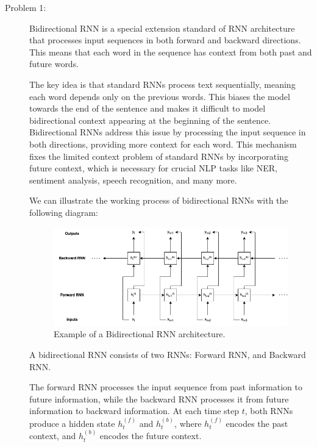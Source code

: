 \documentclass[10pt]{article}
\begin{document}
\begin{description}
\item[Problem 1:] \hfill %

Bidirectional RNN is a special extension standard of RNN architecture that processes input sequences in both forward and backward directions.
This means that each word in the sequence has context from both past and future words.

The key idea is that standard RNNs process text sequentially, meaning each word depends only on the previous words.
This biases the model towards the end of the sentence and makes it difficult to model bidirectional context appearing at the beginning of the sentence.
Bidirectional RNNs address this issue by processing the input sequence in both directions, providing more context for each word.
This mechanism fixes the limited context problem of standard RNNs by incorporating future context, which is necessary for crucial NLP tasks like NER, 
sentiment analysis, speech recognition, and many more.

We can illustrate the working process of bidirectional RNNs with the following diagram:

\begin{figure}[h]
    \centering
    \includegraphics[width=1\textwidth]{biRNN.png}
    \caption{Example of a Bidirectional RNN architecture.}
\end{figure}

A bidirectional RNN consists of two RNNs: Forward RNN, and Backward RNN. 

The forward RNN processes the input sequence from past information to future information, while the backward RNN processes it from 
future information to backward information.
At each time step $t$, both RNNs produce a hidden state $h_t^{(f)}$ and $h_t^{(b)}$, 
where $h_t^{(f)}$ encodes the past context, and $h_t^{(b)}$ encodes the future context.


\end{description}
\end{document}
